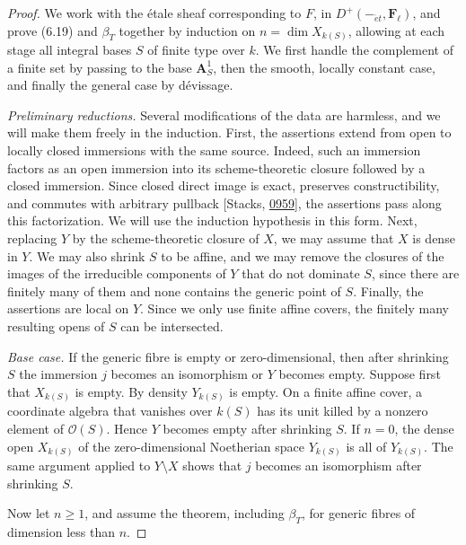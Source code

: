 \documentclass[11pt]{article}
\providecommand{\Fell}{}\renewcommand{\Fell}{\mathbf F_\ell}
\begin{document}
\begin{proof}[{Proof}]\label{bp52}%
We work with the étale sheaf corresponding to \(F\), in \(D^+(-_{\acute{e}t},\Fell)\), and prove (6.19) and \(\beta_T\) together by induction on \(n=\dim X_{k(S)}\), allowing at each stage all integral bases \(S\) of finite type over \(k\). We first handle the complement of a finite set by passing to the base \(\mathbf A^1_S\), then the smooth, locally constant case, and finally the general case by dévissage.

\emph{Preliminary reductions.} Several modifications of the data are harmless, and we will make them freely in the induction. First, the assertions extend from open to locally closed immersions with the same source. Indeed, such an immersion factors as an open immersion into its scheme-theoretic closure followed by a closed immersion. Since closed direct image is exact, preserves constructibility, and commutes with arbitrary pullback [Stacks, \href{https://stacks.math.columbia.edu/tag/0959}{0959}], the assertions pass along this factorization. We will use the induction hypothesis in this form. Next, replacing \(Y\) by the scheme-theoretic closure of \(X\), we may assume that \(X\) is dense in \(Y\). We may also shrink \(S\) to be affine, and we may remove the closures of the images of the irreducible components of \(Y\) that do not dominate \(S\), since there are finitely many of them and none contains the generic point of \(S\). Finally, the assertions are local on \(Y\). Since we only use finite affine covers, the finitely many resulting opens of \(S\) can be intersected.

\emph{Base case.} If the generic fibre is empty or zero-dimensional, then after shrinking \(S\) the immersion \(j\) becomes an isomorphism or \(Y\) becomes empty. Suppose first that \(X_{k(S)}\) is empty. By density \(Y_{k(S)}\) is empty. On a finite affine cover, a coordinate algebra that vanishes over \(k(S)\) has its unit killed by a nonzero element of \(\mathcal O(S)\). Hence \(Y\) becomes empty after shrinking \(S\). If \(n=0\), the dense open \(X_{k(S)}\) of the zero-dimensional Noetherian space \(Y_{k(S)}\) is all of \(Y_{k(S)}\). The same argument applied to \(Y\setminus X\) shows that \(j\) becomes an isomorphism after shrinking \(S\).

Now let \(n\geq1\), and assume the theorem, including \(\beta_T\), for generic fibres of dimension less than \(n\).


\end{proof}
\end{document}
